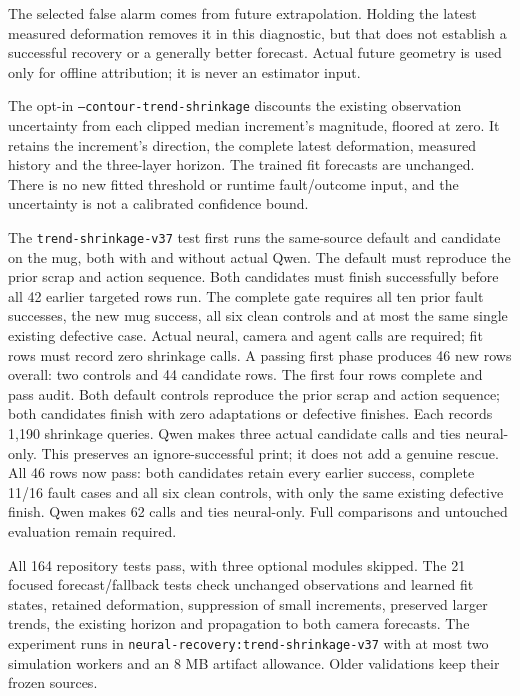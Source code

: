 \documentclass[10pt,letterpaper]{article}
\begin{document}
The selected false alarm comes from future extrapolation. Holding the latest
measured deformation removes it in this diagnostic, but that does not establish
a successful recovery or a generally better forecast. Actual future geometry is
used only for offline attribution; it is never an estimator input.

The opt-in \texttt{--contour-trend-shrinkage} discounts the existing observation
uncertainty from each clipped median increment's magnitude, floored at zero.
It retains the increment's direction, the complete latest deformation, measured
history and the three-layer horizon. The trained fit forecasts are unchanged.
There is no new fitted threshold or runtime fault/outcome input, and the
uncertainty is not a calibrated confidence bound.

The \texttt{trend-shrinkage-v37} test first runs the same-source default and
candidate on the mug, both with and without actual Qwen. The default must
reproduce the prior scrap and action sequence. Both candidates must finish
successfully before all 42 earlier targeted rows run. The complete gate requires
all ten prior fault successes, the new mug success, all six clean controls and
at most the same single existing defective case. Actual neural, camera and
agent calls are required; fit rows must record zero shrinkage calls. A passing
first phase produces 46 new rows overall: two controls and 44 candidate rows.
The first four rows complete and pass audit. Both default controls reproduce the
prior scrap and action sequence; both candidates finish with zero adaptations or
defective finishes. Each records 1,190 shrinkage queries. Qwen makes three actual
candidate calls and ties neural-only. This preserves an ignore-successful print;
it does not add a genuine rescue. All 46 rows now pass: both candidates retain
every earlier success, complete 11/16 fault cases and all six clean controls,
with only the same existing defective finish. Qwen makes 62 calls and ties
neural-only. Full comparisons and untouched evaluation remain required.

All 164 repository tests pass, with three optional modules skipped. The 21 focused
forecast/fallback tests check unchanged observations and learned fit states,
retained deformation, suppression of small increments, preserved larger trends,
the existing horizon and propagation to both camera forecasts. The experiment
runs in \texttt{neural-recovery:trend-shrinkage-v37} with at most two simulation
workers and an 8 MB artifact allowance. Older validations keep their frozen sources.
\end{document}
